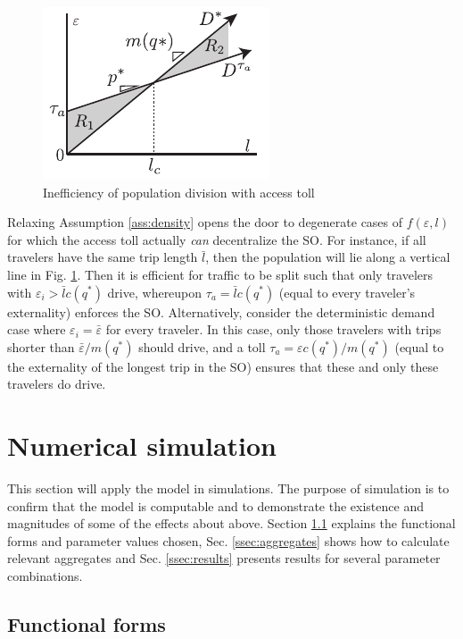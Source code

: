 \documentclass[preprint,authoryear]{elsarticle}
\newcommand{\taua}{\tau_a}
\newcommand{\ve}{\varepsilon}
\begin{document}
\begin{figure}
	\centering
	\includegraphics[width=.5\columnwidth]{img/mode-split2}
	\caption{Inefficiency of population division with access toll}
	\label{fig:mode-split}
\end{figure}

Relaxing Assumption \ref{ass:density} opens the door to degenerate cases of $f(\ve,l)$ for which the access toll actually \emph{can} decentralize the SO. For instance, if all travelers have the same trip length $\bar{l}$, then the population will lie along a vertical line in Fig. \ref{fig:mode-split}. Then it is efficient for traffic to be split such that only travelers with $\ve_i>\bar{l}c(q^*)$ drive, whereupon $\tau_a=\bar{l}c(q^*)$ (equal to every traveler's externality) enforces the SO. Alternatively, consider the deterministic demand case where $\ve_i=\bar{\ve}$ for every traveler. In this case, only those travelers with trips shorter than $\bar{\ve}/m(q^*)$ should drive, and a toll $\taua = \ve c(q^*)/m(q^*)$ (equal to the externality of the longest trip in the SO) ensures that these and only these travelers do drive.

\section{Numerical simulation}
\label{sec:numerical_simulation}

This section will apply the model in simulations. The purpose of simulation is to confirm that the model is computable and to demonstrate the existence and magnitudes of some of the effects about above. Section \ref{ssec:simulation_setup} explains the functional forms and parameter values chosen,  Sec. \ref{ssec:aggregates} shows how to calculate relevant aggregates and Sec. \ref{ssec:results} presents results for several parameter combinations.

\subsection{Functional forms}
\label{ssec:simulation_setup}
\end{document}
